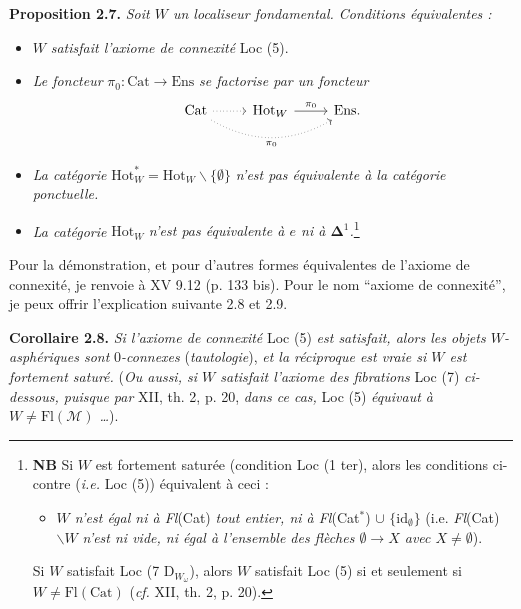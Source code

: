 \documentclass[11pt]{article}
\newcommand{\printedpage}[1]{\marginpar{\footnotesize p.~#1}}
\newcommand{\msp}[1]{\marginpar{\footnotesize [#1]}}
\begin{document}
\textbf{Proposition 2.7.} \textit{Soit $W$ un localiseur fondamental. Conditions équivalentes :}
\begin{itemize}[leftmargin=3em]
\item[a)] $W$ \textit{satisfait l'axiome de connexité} Loc (5).
\item[b)] \textit{Le foncteur} $\pi_0 : \mathrm{Cat} \longrightarrow \mathrm{Ens}$ \textit{se factorise par un foncteur}
\printedpage{7}
\[
\begin{tikzcd}
\mathrm{Cat} \arrow[r, dotted] \arrow[rr, dotted, bend right, "\pi_0"'] & \mathrm{Hot}_W \arrow[r, "\pi_0"] & \mathrm{Ens}.
\end{tikzcd}
\]
\item[c)] \textit{La catégorie} $\mathrm{Hot}^*_W = \mathrm{Hot}_W\backslash\{\emptyset\}$ \textit{n'est pas équivalente à la catégorie ponctuelle.}
\item[c$'$)] \textit{La catégorie} $\mathrm{Hot}_W$ \textit{n'est pas équivalente à $e$ ni à $\boldsymbol{\Delta}^1$.}\footnote{\textbf{NB} Si $W$ est fortement saturée (condition Loc (1 ter), alors les conditions ci-contre (\textit{i.e.} Loc (5)) équivalent à ceci : %
\begin{itemize}[leftmargin=2.5em]
\item[d)] \textit{$W$ n'est égal ni à Fl}(Cat) \textit{tout entier, ni à Fl}(Cat$^*$) $\cup$ $\{\mathrm{id}_\emptyset\}$ (i.e. \textit{Fl}(Cat)$\backslash W$ \textit{n'est ni vide, ni égal à l'ensemble des flèches $\emptyset \longrightarrow X$ avec $X \neq \emptyset$}).
\end{itemize}
Si $W$ satisfait Loc (7 D$_{W_\omega}$), alors $W$ satisfait Loc (5) si et seulement si $W \neq \mathrm{Fl}(\mathrm{Cat})$ (\textit{cf.} XII, th. 2, p. 20).}
\end{itemize}

Pour la démonstration, et pour d'autres formes équivalentes de l'axiome de connexité, \msp{page 13}je renvoie à XV 9.12 (p. 133 bis). Pour le nom “axiome de connexité”, je peux offrir l'explication suivante 2.8 et 2.9.

\textbf{Corollaire 2.8.} \textit{Si l'axiome de connexité} Loc (5) \textit{est satisfait, alors les objets $W$-asphériques sont} 0\textit{-connexes} (\textit{tautologie}), \textit{et la réciproque est vraie si $W$ est fortement saturé.} (\textit{Ou aussi, si $W$ satisfait l'axiome des fibrations} Loc (7) \textit{ci-dessous, puisque par} XII, th. 2, p. 20, \textit{dans ce cas,} Loc (5) \textit{équivaut à $W \neq \mathrm{Fl}(\mathcal{M})$ \ldots}).
\end{document}
